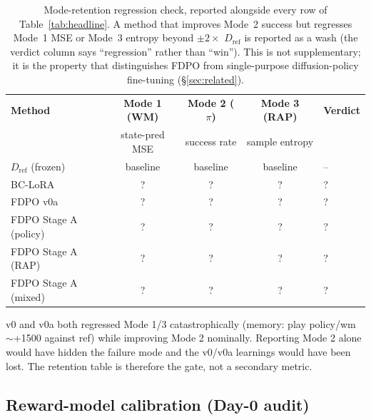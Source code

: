 \documentclass[11pt]{article}
\newcommand{\Dref}{D_{\mathrm{ref}}}
\begin{document}
\begin{table}[h]
    \centering
    \small
    \begin{tabular}{lcccl}
        \hline
        \textbf{Method} & \textbf{Mode 1 (WM)} & \textbf{Mode 2 ($\pi$)} & \textbf{Mode 3 (RAP)} & \textbf{Verdict} \\
        & state-pred MSE & success rate & sample entropy & \\
        \hline
        $\Dref$ (frozen)                        & baseline & baseline & baseline & --   \\
        BC-LoRA                                 & ?        & ?        & ?        & ?    \\
        FDPO v0a                                & ?        & ?        & ?        & ?    \\
        FDPO Stage A (policy)                   & ?        & ?        & ?        & ?    \\
        FDPO Stage A (RAP)                      & ?        & ?        & ?        & ?    \\
        FDPO Stage A (mixed)                    & ?        & ?        & ?        & ?    \\
        \hline
    \end{tabular}
    \caption{Mode-retention regression check, reported alongside every row of Table~\ref{tab:headline}. A method that improves Mode~2 success but regresses Mode~1 MSE or Mode~3 entropy beyond $\pm 2\times$ $\Dref$ is reported as a wash (the verdict column says ``regression'' rather than ``win''). This is not supplementary; it is the property that distinguishes FDPO from single-purpose diffusion-policy fine-tuning (\S\ref{sec:related}).}
    \label{tab:retention}
\end{table}

v0 and v0a both regressed Mode 1/3 catastrophically (memory: play policy/wm $\sim$+1500 against ref) while improving Mode 2 nominally. Reporting Mode 2 alone would have hidden the failure mode and the v0/v0a learnings would have been lost. The retention table is therefore the gate, not a secondary metric.

\subsection{Reward-model calibration (Day-0 audit)}
\label{sec:reward-calibration}
\end{document}
